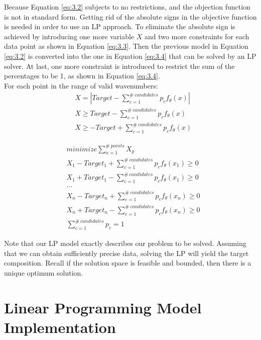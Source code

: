 Because Equation \ref{eq:3.2} subjects to no restrictions, and the objection function is not in standard form. Getting rid of the absolute signs in the objective function is needed in order to use an LP approach. To eliminate the absolute sign is achieved by introducing one more variable $X$ and two more constraints for each data point as shown in Equation \ref{eq:3.3}. Then the previous model in Equation \ref{eq:3.2} is converted into the one in Equation \ref{eq:3.4} that can be solved by an LP solver. At last, one more constraint is introduced to restrict the sum of the percentages to be 1, as shown in Equation \ref{eq:3.4}. \\

For each point in the range of valid wavenumbers:
\begin{eqnarray} \label{eq:3.3}
& X = \left| Target-\displaystyle\sum^{\#~candidates}_{c=1}p_{c}f_{\theta}(x) \right| \nonumber \\
&  X \geq Target-\displaystyle\sum^{\#~candidates}_{c=1}p_{c}f_{\theta}(x)   \nonumber \\
& X \geq -Target+\displaystyle\sum^{\#~candidates}_{c=1}p_{c}f_{\theta}(x)  
\end{eqnarray} 

\begin{eqnarray} \label{eq:3.4}
& minimize \displaystyle\sum^{\#~points}_{n=1} X_p \nonumber \\
& X_1 - Target_1 + \displaystyle\sum^{\#~candidates}_{c=1}p_{c}f_{\theta}(x_1) \geq 0 \nonumber \\
& X_1 + Target_1 - \displaystyle\sum^{\#~candidates}_{c=1}p_{c}f_{\theta}(x_1) \geq 0 \nonumber \\
& ... \nonumber \\
& X_n - Target_n + \displaystyle\sum^{\#~candidates}_{c=1}p_{c}f_{\theta}(x_n) \geq 0 \nonumber \\
& X_n + Target_n - \displaystyle\sum^{\#~candidates}_{c=1}p_{c}f_{\theta}(x_n) \geq 0 \nonumber \\
& \displaystyle\sum^{\#~candidates}_{c=1}p_{c} = 1 
\end{eqnarray} 

Note that our LP model exactly describes our problem to be solved. Assuming that we can obtain sufficiently precise data, solving the LP will yield the target composition. Recall if the solution space is feasible and bounded, then there is a unique optimum solution. \\

\section{Linear Programming Model Implementation}

